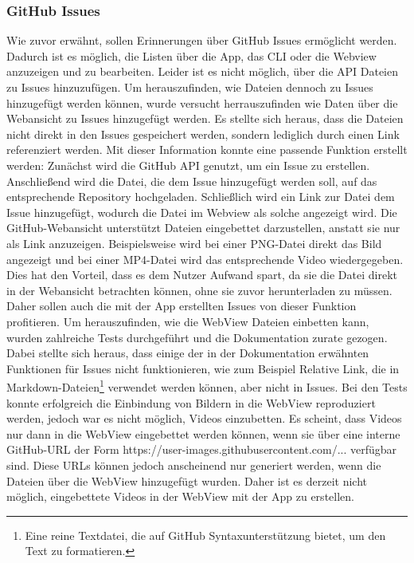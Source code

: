 \subsubsection{GitHub Issues}%
Wie zuvor erwähnt, sollen Erinnerungen über GitHub Issues ermöglicht werden. Dadurch ist es möglich, die Listen über die App, das CLI oder die Webview anzuzeigen und zu bearbeiten.%
Leider ist es nicht möglich, über die API Dateien zu Issues hinzuzufügen\cite{imp_github_issueFilesUnsupported}. %
	Um herauszufinden, wie Dateien dennoch zu Issues hinzugefügt werden können, wurde versucht herrauszufinden wie Daten über die Webansicht zu Issues hinzugefügt werden. Es stellte sich heraus, dass die Dateien nicht direkt in den Issues gespeichert werden, sondern lediglich durch einen Link referenziert werden. %
	Mit dieser Information konnte eine passende Funktion erstellt werden: Zunächst wird die GitHub API genutzt, um ein Issue zu erstellen. Anschließend wird die Datei, die dem Issue hinzugefügt werden soll, auf das entsprechende Repository hochgeladen. Schließlich wird ein Link zur Datei dem Issue hinzugefügt, wodurch die Datei im Webview als solche angezeigt wird. %
\newline%
Die GitHub-Webansicht unterstützt Dateien eingebettet darzustellen, anstatt sie nur als Link anzuzeigen. Beispielsweise wird bei einer PNG-Datei direkt das Bild angezeigt und bei einer MP4-Datei wird das entsprechende Video wiedergegeben. %
Dies hat den Vorteil, dass es dem Nutzer Aufwand spart, da sie die Datei direkt in der Webansicht betrachten können, ohne sie zuvor herunterladen zu müssen.%
Daher sollen auch die mit der App erstellten Issues von dieser Funktion profitieren. Um herauszufinden, wie die WebView Dateien einbetten kann, wurden zahlreiche Tests durchgeführt und die Dokumentation zurate gezogen\cite{imp_github_syntaxing}. Dabei stellte sich heraus, dass einige der in der Dokumentation erwähnten Funktionen für Issues nicht funktionieren, wie zum Beispiel \glqq Relative Link\grqq{}, die in Markdown-Dateien\footnote{Eine reine Textdatei, die auf GitHub Syntaxunterstützung bietet, um den Text zu formatieren.} verwendet werden können, aber nicht in Issues.
Bei den Tests konnte erfolgreich die Einbindung von Bildern in die WebView reproduziert werden, jedoch war es nicht möglich, Videos einzubetten. Es scheint, dass Videos nur dann in die WebView eingebettet werden können, wenn sie über eine interne GitHub-URL der Form \glqq https://user-images.githubusercontent.com/...\grqq{} verfügbar sind. Diese URLs können jedoch anscheinend nur generiert werden, wenn die Dateien über die WebView hinzugefügt wurden. Daher ist es derzeit nicht möglich, eingebettete Videos in der WebView mit der App zu erstellen.%
